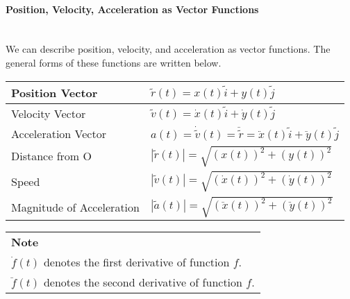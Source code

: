 \documentclass[a4paper]{article}
\newenvironment{Note}{
	\bgroup
	\def\arraystretch{1.5}
	\begin{NiceTabularX}{\textwidth}{X}
		\CodeBefore
		\columncolor{red!15}{1}
		\Body
		\textbf{Note} \\
}{
	\end{NiceTabularX}
	\egroup\mbox{}\\
}{}
\begin{document}
				\paragraph{Position, Velocity, Acceleration as Vector Functions}\mbox{}\\
				We can describe position, velocity, and acceleration as vector functions. The general forms of these functions are written below.
				\bgroup
				\def\arraystretch{2.5}
				\begin{table}[H]
					\centering
					\begin{tabular}{|l|l|}
						\hline
						Position Vector & $\utilde{r}(t)=x(t)\utilde{i}+y(t)\utilde{j}$ \\
						\hline
						Velocity Vector & $\utilde{v}(t)=\dot{x}(t)\utilde{i}+\dot{y}(t)\utilde{j}$ \\
						\hline
						Acceleration Vector & $a(t)=\dot{\utilde{v}}(t)=\ddot{\utilde{r}}=\ddot{x}(t)\utilde{i}+\ddot{y}(t)\utilde{j}$\\
						\hline
						Distance from O & $|\utilde{r}(t)|=\sqrt{(x(t))^2+(y(t))^2}$ \\
						\hline
						Speed & $|\utilde{v}(t)|=\sqrt{(\dot{x}(t))^2+(\dot{y}(t))^2}$ \\
						\hline
						Magnitude of Acceleration & $|\utilde{a}(t)|=\sqrt{(\ddot{x}(t))^2+(\ddot{y}(t))^2}$ \\
						\hline
					\end{tabular}
				\end{table}
				\egroup
				\begin{Note}
					$\dot{f}(t)$ denotes the first derivative of function $f$. \\
					$\ddot{f}(t)$ denotes the second derivative of function $f$.
				\end{Note}
\end{document}
